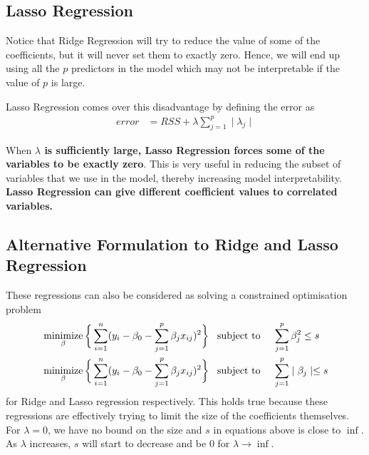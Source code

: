 \documentclass[../statistical_learning_notes.tex]{subfiles}
\begin{document}
    
    \subsection{Lasso Regression}
    Notice that Ridge Regression will try to reduce the value of some of the coefficients, but it will never set them to exactly zero. Hence, we will end up using all the $p$ predictors in the model which may not be interpretable if the value of $p$ is large.\newline

    Lasso Regression comes over this disadvantage by defining the error as
    \begin{align*}
        error &= RSS + \lambda \sum_{j=1}^{p}\mid \lambda_{j} \mid
    \end{align*}

    When \textbf{$\lambda$ is sufficiently large, Lasso Regression forces some of the variables to be exactly zero}. This is very useful in reducing the subset of variables that we use in the model, thereby increasing model interpretability.\newline
    \textbf{Lasso Regression can give different coefficient values to correlated variables.}


    \subsection{Alternative Formulation to Ridge and Lasso Regression}
    These regressions can also be considered as solving a constrained optimisation problem
    \begin{align*}
        &\operatorname*{minimize}_{\beta}  \bigg\{\sum_{i=1}^{n} (y_{i} - \beta_{0} - \sum_{j=1}^{p}\beta_{j}x_{ij})^{2} \bigg\} \text{\;\;\;subject to\;} &&\sum_{j=1}^{p}\beta_{j}^{2} \leq s \\
        &\operatorname*{minimize}_{\beta}  \bigg\{\sum_{i=1}^{n} (y_{i} - \beta_{0} - \sum_{j=1}^{p}\beta_{j}x_{ij})^{2} \bigg\} \text{\;\;\;subject to\;} &&\sum_{j=1}^{p}\mid \beta_{j} \mid \leq s
    \end{align*}
    for Ridge and Lasso regression respectively. This holds true because these regressions are effectively trying to limit the size of the coefficients themselves. For $\lambda = 0$, we have no bound on the size and $s$ in equations above is close to $\inf$. As $\lambda$ increases, $s$ will start to decrease and be $0$ for $\lambda \to \inf$. \newline
\end{document}
